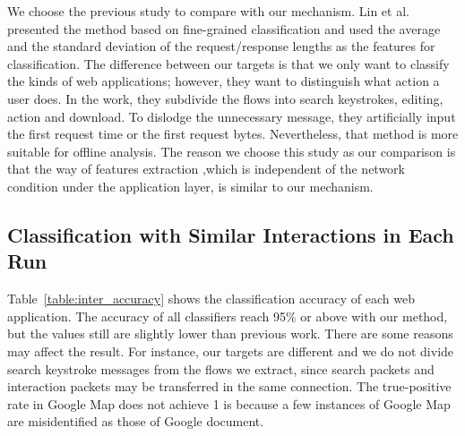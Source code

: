 We choose the previous study to compare with our mechanism. Lin et al. presented the method based on fine-grained classification and used the average and the standard deviation of the request/response lengths as the features for classification. The difference between our targets is that we only want to classify the kinds of web applications; however, they want to distinguish what action a user does. In the work, they subdivide the flows into search keystrokes, editing, action and download. To dislodge the unnecessary message, they artificially input the first request time or the first request bytes. Nevertheless, that method is more suitable for offline analysis. The reason we choose this study as our comparison is that the way of features extraction ,which is independent of the network condition under the application layer, is similar to our mechanism.

\subsection{Classification with Similar Interactions in Each Run}
Table~\ref{table:inter_accuracy} shows the classification accuracy of each web application. The accuracy of all classifiers reach 95\% or above with our method, but the values still are slightly lower than previous work. There are some reasons may affect the result. For instance, our targets are different and we do not divide search keystroke messages from the flows we extract, since search packets and interaction packets may be transferred in the same connection. The true-positive rate in Google Map does not achieve 1 is because a few instances of Google Map are misidentified as those of Google document.


